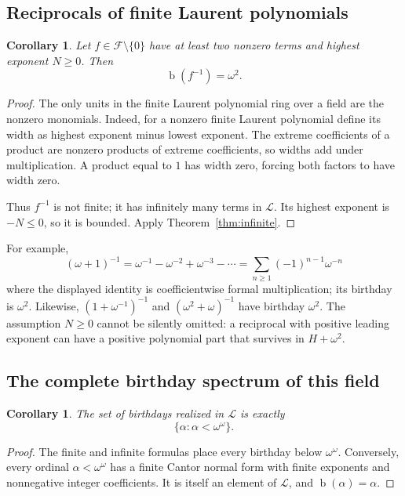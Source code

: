 \documentclass[11pt,letterpaper]{article}
\numberwithin{equation}{section}
\newtheorem{corollary}[theorem]{Corollary}
\theoremstyle{definition}
\theoremstyle{remark}
\newcommand{\Lau}{\mathcal{L}}
\newcommand{\Fin}{\mathcal{F}}
\newcommand{\bd}{\operatorname{b}}
\begin{document}
\subsection{Reciprocals of finite Laurent polynomials}
\begin{corollary}\label{cor:reciprocal}
Let $f\in\Fin\setminus\{0\}$ have at least two nonzero terms and highest
exponent $N\geq0$. Then
\begin{equation}\label{eq:reciprocal}
 \bd(f^{-1})=\omega^2.
\end{equation}
\end{corollary}
\begin{proof}
The only units in the finite Laurent polynomial ring over a field are the
nonzero monomials. Indeed, for a nonzero finite Laurent polynomial define its
width as highest exponent minus lowest exponent. The extreme coefficients of
a product are nonzero products of extreme coefficients, so widths add under
multiplication. A product equal to $1$ has width zero, forcing both factors to
have width zero.

Thus $f^{-1}$ is not finite; it has infinitely many terms in $\Lau$. Its
highest exponent is $-N\leq0$, so it is bounded. Apply
Theorem~\ref{thm:infinite}.
\end{proof}

For example,
\[
 (\omega+1)^{-1}
 =\omega^{-1}-\omega^{-2}+\omega^{-3}-\cdots
=\sum_{n\geq1}(-1)^{n-1}\omega^{-n}
\]
where the displayed identity is coefficientwise formal multiplication; its
birthday is $\omega^2$. Likewise, $(1+\omega^{-1})^{-1}$ and
$(\omega^2+\omega)^{-1}$ have birthday $\omega^2$.
The assumption $N\geq0$ cannot be silently omitted: a reciprocal with positive
leading exponent can have a positive polynomial part that survives in
$H+\omega^2$.

\subsection{The complete birthday spectrum of this field}
\begin{corollary}\label{cor:spectrum}
The set of birthdays realized in $\Lau$ is exactly
\[
 \{\alpha:\alpha<\omega^\omega\}.
\]
\end{corollary}
\begin{proof}
The finite and infinite formulas place every birthday below $\omega^\omega$.
Conversely, every ordinal $\alpha<\omega^\omega$ has a finite Cantor normal
form with finite exponents and nonnegative integer coefficients. It is itself
an element of $\Lau$, and $\bd(\alpha)=\alpha$.
\end{proof}
\end{document}
